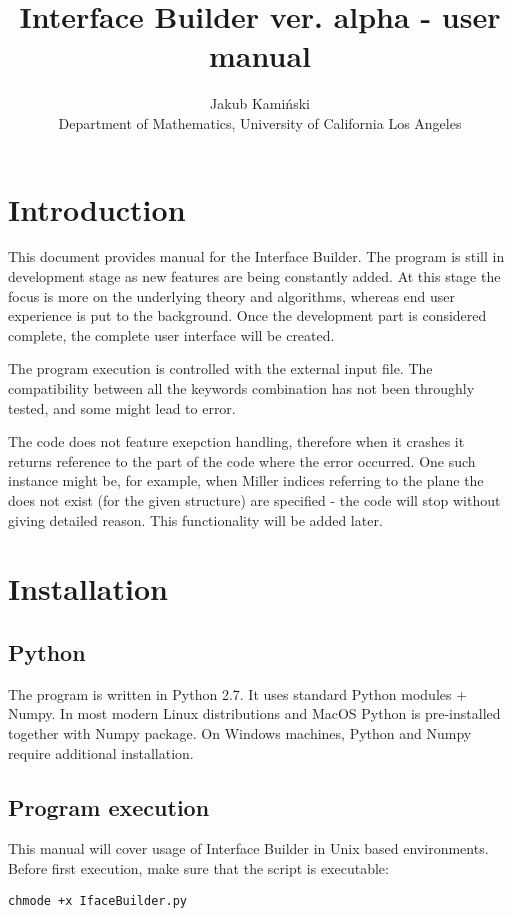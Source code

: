 \documentclass[a4paper,12pt,oneside]{article}
\begin{document}
\title{Interface Builder ver. alpha - user manual}
\author{Jakub Kami{\'n}ski
\\
Department of Mathematics,
University of California Los Angeles \\
}
\maketitle
\section{Introduction}
This document provides manual for the Interface Builder. The program is still in
development stage as new features are being constantly added. At this stage the
focus is more on the underlying theory and algorithms, whereas end user
experience is put to the background. Once the development part is considered
complete, the complete user interface will be created. 

The program execution is controlled with the external input file.  
The compatibility between all the keywords combination has not been throughly 
tested, and some might lead to error.

The code does not feature exepction handling, therefore when it crashes it 
returns
reference to the part of the code where the error occurred. One such instance
might be, for example, when Miller indices referring to the plane the does not
exist (for the given structure) are specified  - the code will stop without
giving detailed reason. This functionality will be added later.

\section{Installation}
\subsection{Python}
The program is written in Python 2.7. It uses standard Python modules + Numpy. 
In most modern Linux distributions and MacOS Python is pre-installed together
with Numpy package. On Windows machines, Python and Numpy require additional
installation.
\subsection{Program execution}
This manual will cover usage of Interface Builder in Unix based environments. 
\noindent
Before first execution, make sure that the script is executable:
\begin{verbatim}
chmode +x IfaceBuilder.py
\end{verbatim}
\end{document}
